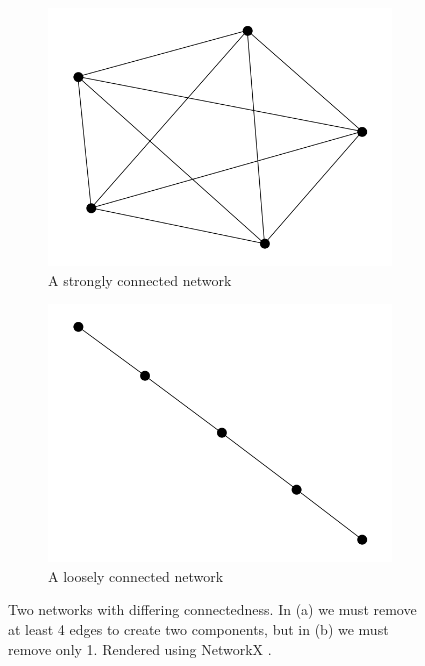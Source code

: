 \begin{figure}
    \begin{center}
        \begin{subfigure}[b]{0.45\textwidth}
            \includegraphics[width=\textwidth]{img/2/complete}
            \caption{A strongly connected network}
            \label{fig:strongly_connected_network}
        \end{subfigure}
        \begin{subfigure}[b]{0.45\textwidth}
            \includegraphics[width=\textwidth]{img/2/path}
            \caption{A loosely connected network}
            \label{fig:loosely_connected_network}
        \end{subfigure}
    \end{center}
    \caption{Two networks with differing connectedness. In (a) we must remove at least 4 edges to create two components, but in (b) we must remove only 1. Rendered using NetworkX \cite{SciPyProceedings_11}.}
    \label{fig:connectivity_strengths}
\end{figure}

